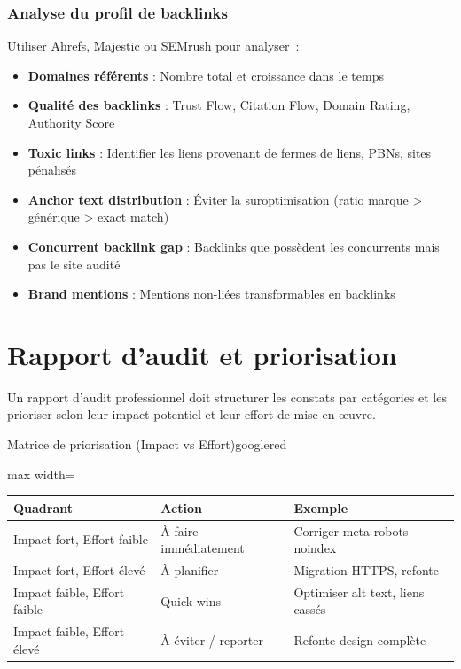 \documentclass[12pt,a4paper,twoside]{report}
\begin{document}
\subsubsection{Analyse du profil de backlinks}

Utiliser Ahrefs, Majestic ou SEMrush pour analyser~:
\begin{itemize}
    \item \textbf{Domaines référents} : Nombre total et croissance dans le temps
    \item \textbf{Qualité des backlinks} : Trust Flow, Citation Flow, Domain Rating, Authority Score
    \item \textbf{Toxic links} : Identifier les liens provenant de fermes de liens, PBNs, sites pénalisés
    \item \textbf{Anchor text distribution} : Éviter la suroptimisation (ratio marque > générique > exact match)
    \item \textbf{Concurrent backlink gap} : Backlinks que possèdent les concurrents mais pas le site audité
    \item \textbf{Brand mentions} : Mentions non-liées transformables en backlinks
\end{itemize}

\section{Rapport d'audit et priorisation}

Un rapport d'audit professionnel doit structurer les constats par catégories et les prioriser selon leur impact potentiel et leur effort de mise en œuvre.

\begin{mybox}{Matrice de priorisation (Impact vs Effort)}{googlered}
\begin{adjustbox}{max width=\textwidth}
\begin{tabular}{lll}
\toprule
\textbf{Quadrant} & \textbf{Action} & \textbf{Exemple} \\
\midrule
Impact fort, Effort faible & À faire immédiatement & Corriger meta robots noindex \\
Impact fort, Effort élevé & À planifier & Migration HTTPS, refonte \\
Impact faible, Effort faible & Quick wins & Optimiser alt text, liens cassés \\
Impact faible, Effort élevé & À éviter / reporter & Refonte design complète \\
\bottomrule
\end{tabular}
\end{adjustbox}
\end{mybox}
\end{document}
